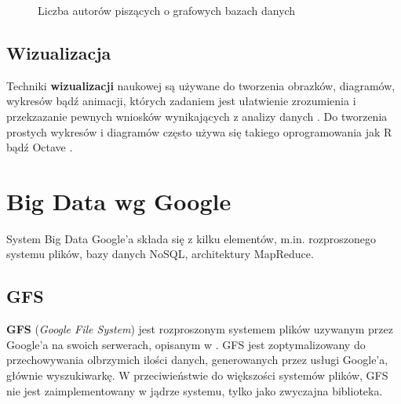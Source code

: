 \documentclass[10pt,twocolumn]{llncs}          %
\begin{document}
\begin{figure}
	\centering
	\caption{Liczba autorów piszących o grafowych bazach danych}
	\label{fig:journal:graph}
\end{figure}

\subsection{Wizualizacja}
\label{sub:wizualizacja}
Techniki \textbf{wizualizacji} naukowej są używane do tworzenia obrazków, diagramów, wykresów bądź animacji, których zadaniem jest ułatwienie zrozumienia i przekzazanie pewnych wniosków wynikających z analizy danych \cite{lawrence1994}. Do tworzenia prostych wykresów i diagramów często używa się takiego oprogramowania jak R \cite{www:R} bądź Octave \cite{www:octave}.

\section{Big Data wg Google}
\label{ssub:google}
System Big Data Google'a składa się z kilku elementów, m.in. rozproszonego systemu plików, bazy danych NoSQL, architektury MapReduce.

\subsection{GFS}
\label{ssub:gfs}
\textbf{GFS} (\textit{Google File System}) jest rozproszonym systemem plików uzywanym przez Google'a na swoich serwerach, opisanym w \cite{ghemawat03}. GFS jest zoptymalizowany do przechowywania olbrzymich ilości danych, generowanych przez usługi Google'a, głównie wyszukiwarkę. W przeciwieństwie do większości systemów plików, GFS nie jest zaimplementowany w jądrze systemu, tylko jako zwyczajna biblioteka.
\end{document}
